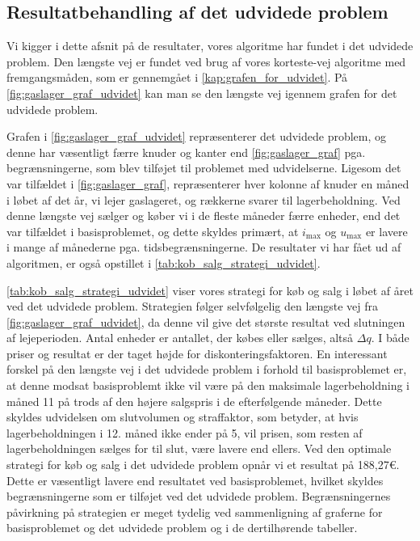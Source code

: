 \subsection{Resultatbehandling af det udvidede problem} \label{kap:resultat_udvidet}

Vi kigger i dette afsnit på de resultater, vores algoritme har fundet i det udvidede problem. Den længste vej er fundet ved brug af vores korteste-vej algoritme med fremgangsmåden, som er gennemgået i \autoref{kap:grafen_for_udvidet}. På \ref{fig:gaslager_graf_udvidet} kan man se den længste vej igennem grafen for det udvidede problem.

Grafen i \autoref{fig:gaslager_graf_udvidet} repræsenterer det udvidede problem, og denne har væsentligt færre knuder og kanter end \autoref{fig:gaslager_graf} pga. begrænsningerne, som blev tilføjet til problemet med udvidelserne. Ligesom det var tilfældet i \autoref{fig:gaslager_graf}, repræsenterer hver kolonne af knuder en måned i løbet af det år, vi lejer gaslageret, og rækkerne svarer til lagerbeholdning. Ved denne længste vej sælger og køber vi i de fleste måneder færre enheder, end det var tilfældet i basisproblemet, og dette skyldes primært, at $i_{\max}$ og $u_{\max}$ er lavere i mange af månederne pga. tidsbegrænsningerne. De resultater vi har fået ud af algoritmen, er også opstillet i \autoref{tab:kob_salg_strategi_udvidet}. 

\autoref{tab:kob_salg_strategi_udvidet} viser vores strategi for køb og salg i løbet af året ved det udvidede problem. Strategien følger selvfølgelig den længste vej fra \autoref{fig:gaslager_graf_udvidet}, da denne vil give det største resultat ved slutningen af lejeperioden. Antal enheder er antallet, der købes eller sælges, altså $\Delta q$. I både priser og resultat er der taget højde for diskonteringsfaktoren. En interessant forskel på den længste vej i det udvidede problem i forhold til basisproblemet er, at denne modsat basisproblemt ikke vil være på den maksimale lagerbeholdning i måned 11 på trods af den højere salgspris i de efterfølgende måneder. Dette skyldes udvidelsen om slutvolumen og straffaktor, som betyder, at hvis lagerbeholdningen i 12. måned ikke ender på 5, vil prisen, som resten af lagerbeholdningen sælges for til slut, være lavere end ellers. 
Ved den optimale strategi for køb og salg i det udvidede problem opnår vi et resultat på 188,27€. Dette er væsentligt lavere end resultatet ved basisproblemet, hvilket skyldes begrænsningerne som er tilføjet ved det udvidede problem. Begrænsningernes påvirkning på strategien er meget tydelig ved sammenligning af graferne for basisproblemet og det udvidede problem og i de dertilhørende tabeller. 